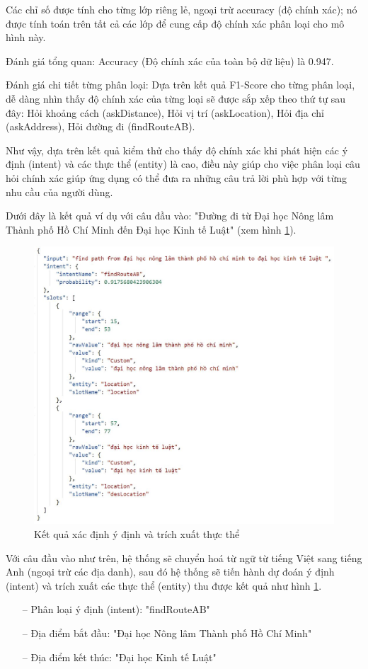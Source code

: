 Các chỉ số được tính cho từng lớp riêng lẻ, ngoại trừ accuracy (độ chính xác); nó được tính toán trên tất cả các lớp để cung cấp độ chính xác phân loại cho mô hình này.

Đánh giá tổng quan: Accuracy (Độ chính xác của toàn bộ dữ liệu) là 0.947.

Đánh giá chi tiết từng phân loại: Dựa trên kết quả F1-Score cho từng phân loại, dễ dàng nhìn thấy độ chính xác của từng loại sẽ được sắp xếp theo thứ tự sau đây: Hỏi khoảng cách (askDistance), Hỏi vị trí (askLocation), Hỏi địa chỉ (askAddress), Hỏi đường đi (findRouteAB).

Như vậy, dựa trên kết quả kiểm thử cho thấy độ chính xác khi phát hiện các ý định (intent) và các thực thể (entity) là cao, điều này giúp cho việc phân loại câu hỏi chính xác giúp ứng dụng có thể đưa ra những câu trả lời phù hợp với từng nhu cầu của người dùng.

Dưới đây là kết quả ví dụ với câu đầu vào: "Đường đi từ Đại học Nông lâm Thành phố Hồ Chí Minh đến Đại học Kinh tế Luật" (xem hình \ref{fig:detect-intent}).

\begin{figure}[H]
    \centering
    \includegraphics[width=15cm]{images/detect_intent.jpg}
    \caption{Kết quả xác định ý định và trích xuất thực thể}
    \label{fig:detect-intent}
\end{figure}

Với câu đầu vào như trên, hệ thống sẽ chuyển hoá từ ngữ từ tiếng Việt sang tiếng Anh (ngoại trừ các địa danh), sau đó hệ thống sẽ tiến hành dự đoán ý định (intent) và trích xuất các thực thể (entity) thu được kết quả như hình \ref{fig:detect-intent}.
\begin{itemize}
    \item[--] Phân loại ý định (intent): "findRouteAB"
    \item[--] Địa điểm bắt đầu: "Đại học Nông lâm Thành phố Hồ Chí Minh"
    \item[--] Địa điểm kết thúc: "Đại học Kinh tế Luật"
\end{itemize}

